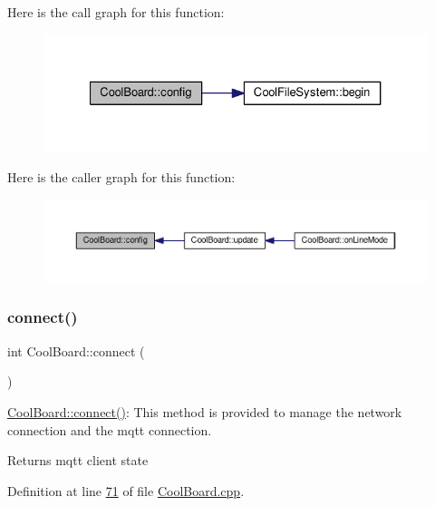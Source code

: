 Here is the call graph for this function\+:\nopagebreak
\begin{figure}[H]
\begin{center}
\leavevmode
\includegraphics[width=327pt]{class_cool_board_a583a874c09c07e70a6eb9229fc4beddb_cgraph}
\end{center}
\end{figure}
Here is the caller graph for this function\+:\nopagebreak
\begin{figure}[H]
\begin{center}
\leavevmode
\includegraphics[width=350pt]{class_cool_board_a583a874c09c07e70a6eb9229fc4beddb_icgraph}
\end{center}
\end{figure}
\mbox{\label{class_cool_board_a519de78b807f8ec6463ff484eb925918}} 
\subsubsection{\texorpdfstring{connect()}{connect()}}
{\footnotesize\ttfamily int Cool\+Board\+::connect (\begin{DoxyParamCaption}{ }\end{DoxyParamCaption})}

\hyperlink{class_cool_board_a519de78b807f8ec6463ff484eb925918}{Cool\+Board\+::connect()}\+: This method is provided to manage the network connection and the mqtt connection.

\begin{DoxyReturn}{Returns}
mqtt client state 
\end{DoxyReturn}


Definition at line \hyperlink{_cool_board_8cpp_source_l00071}{71} of file \hyperlink{_cool_board_8cpp_source}{Cool\+Board.\+cpp}.




